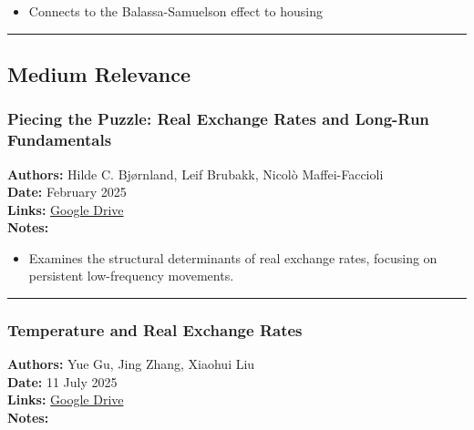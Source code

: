 \documentclass[
  11pt,
]{article}
\providecommand{\tightlist}{%
  \setlength{\itemsep}{0pt}\setlength{\parskip}{0pt}}
\begin{document}
\begin{itemize}
\tightlist
\item
  Connects to the Balassa-Samuelson effect to housing
\end{itemize}

\begin{center}\rule{0.5\linewidth}{0.5pt}\end{center}

\subsection{Medium Relevance}\label{medium-relevance}

\subsubsection{Piecing the Puzzle: Real Exchange Rates and Long-Run
Fundamentals}\label{piecing-the-puzzle-real-exchange-rates-and-long-run-fundamentals}

\textbf{Authors:} Hilde C. Bjørnland, Leif Brubakk, Nicolò
Maffei-Faccioli\\
\textbf{Date:} February 2025\\
\textbf{Links:}
\href{https://drive.google.com/file/d/1r4zwdG1oeC5fSfW7nBtjWwDWBQFNNTmZ/view?usp=sharing}{Google
Drive}\\
\textbf{Notes:}

\begin{itemize}
\tightlist
\item
  Examines the structural determinants of real exchange rates, focusing
  on persistent low-frequency movements.
\end{itemize}

\begin{center}\rule{0.5\linewidth}{0.5pt}\end{center}

\subsubsection{Temperature and Real Exchange
Rates}\label{temperature-and-real-exchange-rates}

\textbf{Authors:} Yue Gu, Jing Zhang, Xiaohui Liu\\
\textbf{Date:} 11 July 2025\\
\textbf{Links:}
\href{https://drive.google.com/file/d/1mEMh-d8eDPpk9WaKuob5Wz34xlObrjSt/view?usp=sharing}{Google
Drive}\\
\textbf{Notes:}
\end{document}
